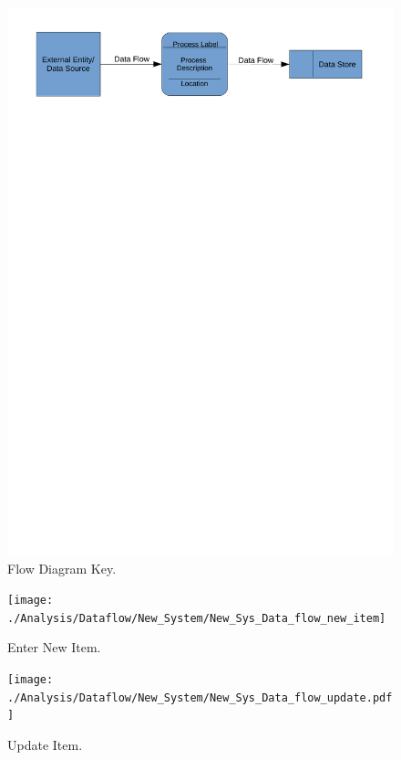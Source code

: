 \begin{figure}[H]
    \includegraphics[width=\textwidth]{./Analysis/Dataflow/DFD_analysis_key.pdf}
    \caption{Flow Diagram Key.} \label{fig:print_function_result}
\end{figure}

\begin{figure}[H]
    \texttt{[image: ./Analysis/Dataflow/New\_System/New\_Sys\_Data\_flow\_new\_item]}
    \caption{Enter New Item.} \label{fig:print_function_result}
\end{figure}

\begin{figure}[H]
    \texttt{[image: ./Analysis/Dataflow/New\_System/New\_Sys\_Data\_flow\_update.pdf]}
    \caption{Update Item.} \label{fig:print_function_result}
\end{figure}

\newpage

